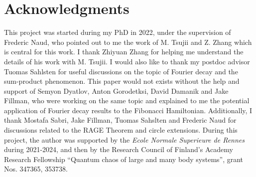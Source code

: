 \documentclass[a4paper]{article}
\theoremstyle{definition}
\begin{document}
\section*{Acknowledgments}

This project was started during my PhD in 2022, under the supervision of {Frederic Naud}, who pointed out to me the work of M. Tsujii and Z. Zhang which is central for this work. I thank {Zhiyuan Zhang} for helping me understand the details of his work with M. Tsujii. I would also like to thank my postdoc advisor {Tuomas Sahlsten} for useful discussions on the topic of Fourier decay and the sum-product phenomenon. This paper would not exists without the help and support of {Semyon Dyatlov}, {Anton Gorodetksi}, {David Damanik} and {Jake Fillman}, who were working on the same topic and explained to me the potential application of Fourier decay results to the Fibonacci Hamiltonian. Additionally, I thank Mostafa Sabri, Jake Fillman, Tuomas Sahslten and Frederic Naud for discussions related to the RAGE Theorem and circle extensions. During this project, the author was supported by the \emph{Ecole Normale Superieure de Rennes} during 2021-2024, and then by the Research Council of Finland’s Academy Research Fellowship “Quantum chaos of large and many body systems”, grant Nos. 347365, 353738.
\end{document}
